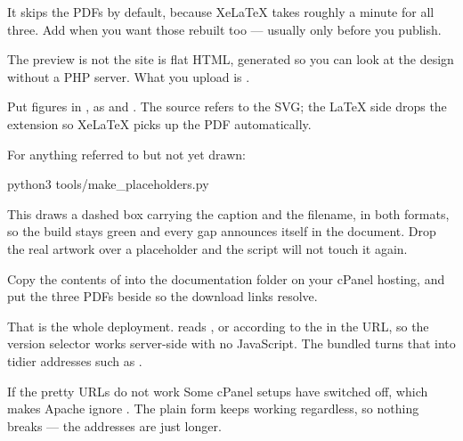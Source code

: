 \documentclass{symbulator}
\begin{document}
It skips the PDFs by default, because XeLaTeX takes roughly a minute for all
three. Add  when you want those rebuilt too --- usually only
before you publish.

\begin{callouttip}{The preview is not the site}
 is flat HTML, generated so you can look at the design
without a PHP server. What you upload is .
\end{callouttip}


Put figures in , as  and
. The source refers to the SVG; the LaTeX side drops the
extension so XeLaTeX picks up the PDF automatically.

For anything referred to but not yet drawn:

\begin{symtype}
python3 tools/make\_placeholders.py
\end{symtype}

This draws a dashed box carrying the caption and the filename, in both formats,
so the build stays green and every gap announces itself in the document. Drop
the real artwork over a placeholder and the script will not touch it again.


Copy the contents of  into the documentation folder on your
cPanel hosting, and put the three PDFs beside  so the
download links resolve.

That is the whole deployment.  reads
,  or  according to the
 in the URL, so the version selector works server-side with no
JavaScript. The bundled  turns that into tidier addresses
such as .

\begin{calloutnote}{If the pretty URLs do not work}
Some cPanel setups have  switched off, which makes
Apache ignore . The plain  form
keeps working regardless, so nothing breaks --- the addresses are just longer.
\end{calloutnote}
\end{document}
